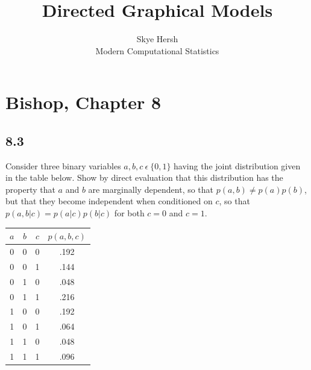 \documentclass[11pt, oneside]{article}\usepackage[]{graphicx}\usepackage[]{color}
\title{Directed Graphical Models}
\author{Skye Hersh \\ Modern Computational Statistics}
\begin{document}
\maketitle

\section*{Bishop, Chapter 8}
\subsection*{8.3}
Consider three binary variables $a, b, c\ \epsilon\ \{0, 1\}$ having the joint distribution given in the table below. Show by direct evaluation that this distribution has the property that $a$ and $b$ are marginally dependent, so that $p(a, b) ≠ p(a)p(b)$, but that they become independent when conditioned on $c$, so that $p(a, b|c) = p(a|c)p(b|c)$ for both $c = 0$ and $c = 1$.

  \begin{table}[h!]
  \centering
  \begin{tabular}{ |c|c|c|c| }
  \hline
  $a$ & $b$ & $c$ & $p(a, b, c)$ \\
  \hline
  0 & 0 & 0 & .192 \\
  0 & 0 & 1 & .144 \\
  0 & 1 & 0 & .048 \\ 
  0 & 1 & 1 & .216 \\
  1 & 0 & 0 & .192 \\
  1 & 0 & 1 & .064 \\
  1 & 1 & 0 & .048 \\
  1 & 1 & 1 & .096 \\
  \hline
  \end{tabular}
  \end{table}
\end{document}
